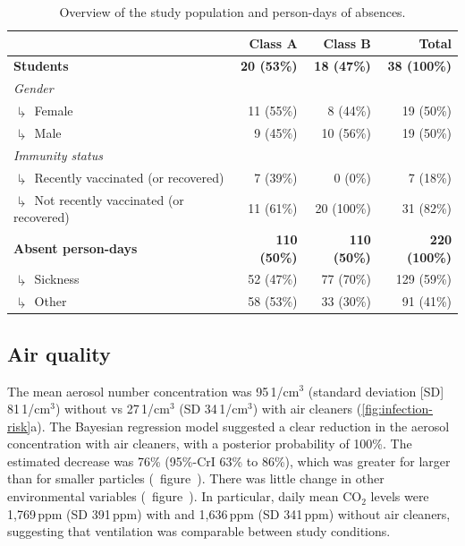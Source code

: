 \documentclass[fleqn,11pt]{wlscirep}
\begin{document}
\begin{table}[!htpb]
    \centering
    \caption{Overview of the study population and person-days of absences.}
    \label{tab:cases-overview-school}
    \footnotesize
    \renewcommand{\arraystretch}{1.5}
    \begin{tabular}{l r r r}
    \toprule
         &  Class A & Class B & Total \\ \midrule 
        \textbf{Students} & \textbf{20 (53\%)} & \textbf{18 (47\%)} & \textbf{38 (100\%)} \\
        \emph{Gender} \\
        $\drsh$ Female & 11 (55\%) & 8 (44\%) & 19 (\hphantom{0}50\%) \\
        $\drsh$ Male & 9 (45\%) & 10 (56\%) & 19 (\hphantom{0}50\%) \\
        \emph{Immunity status} \\
        $\drsh$ Recently vaccinated (or recovered) & 7 (39\%) & 0 (0\%) & 7 (\hphantom{0}18\%) \\
        $\drsh$ Not recently vaccinated (or recovered) & 11 (61\%) & 20 (100\%) & 31 (\hphantom{0}82\%) \\
        \textbf{Absent person-days} & \textbf{110 (50\%)} & \textbf{110 (50\%)} & \textbf{220 (100\%)} \\
        $\drsh$ Sickness & 52 (47\%) & 77 (70\%) & 129 (\hphantom{0}59\%) \\
        $\drsh$ Other & 58 (53\%) & 33 (30\%) & 91 (\hphantom{0}41\%) \\
        \bottomrule
    \end{tabular} 
\end{table}

\subsection*{Air quality}

The mean aerosol number concentration was 95\,1/cm$^3$ (standard deviation [SD] 81\,1/cm$^3$) without vs 27\,1/cm$^3$ (SD 34\,1/cm$^3$) with air cleaners (\cref{fig:infection-risk}a). The Bayesian regression model suggested a clear reduction in the aerosol concentration with air cleaners, with a posterior probability of 100\%. The estimated decrease was 76\% (95\%-CrI 63\% to 86\%), which was greater for larger than for smaller particles (\supp~figure~). There was little change in other environmental variables (\supp~figure~). In particular, daily mean CO$_2$ levels were 1,769\,ppm (SD 391\,ppm) with and 1,636\,ppm (SD 341\,ppm) without air cleaners, suggesting that ventilation was comparable between study conditions.
\end{document}
